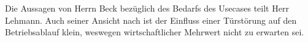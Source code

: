 Die Aussagen von Herrn Beck bezüglich des Bedarfs des Usecases teilt Herr Lehmann. Auch seiner Ansicht nach ist der Einfluss einer Türstörung auf den Betriebsablauf klein, weswegen wirtschaftlicher Mehrwert nicht zu erwarten sei.



